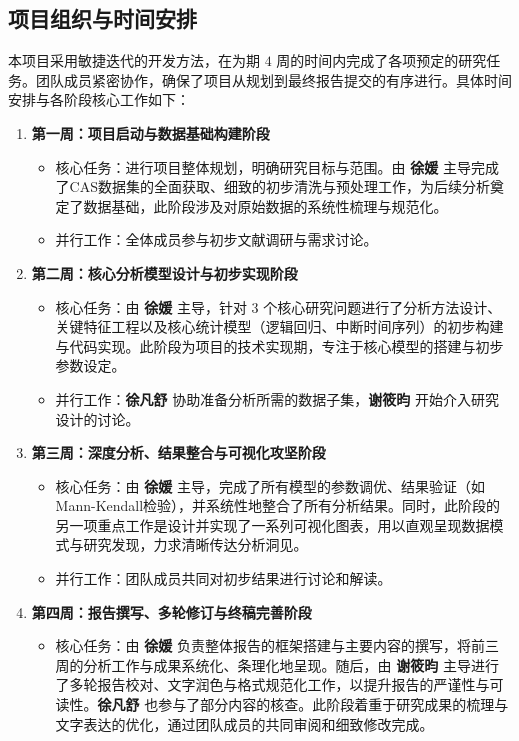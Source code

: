 \documentclass[12pt,a4paper]{article}
\begin{document}
\subsection{项目组织与时间安排}

本项目采用敏捷迭代的开发方法，在为期 $4$ 周的时间内完成了各项预定的研究任务。团队成员紧密协作，确保了项目从规划到最终报告提交的有序进行。具体时间安排与各阶段核心工作如下：

\begin{enumerate}
\item \textbf{第一周：项目启动与数据基础构建阶段}
    \begin{itemize}
    \item 核心任务：进行项目整体规划，明确研究目标与范围。由 \textbf{徐媛} 主导完成了CAS数据集的全面获取、细致的初步清洗与预处理工作，为后续分析奠定了数据基础，此阶段涉及对原始数据的系统性梳理与规范化。
    \item 并行工作：全体成员参与初步文献调研与需求讨论。
    \end{itemize}

\item \textbf{第二周：核心分析模型设计与初步实现阶段}
    \begin{itemize}
    \item 核心任务：由 \textbf{徐媛} 主导，针对 $3$ 个核心研究问题进行了分析方法设计、关键特征工程以及核心统计模型（逻辑回归、中断时间序列）的初步构建与代码实现。此阶段为项目的技术实现期，专注于核心模型的搭建与初步参数设定。
    \item 并行工作：\textbf{徐凡舒} 协助准备分析所需的数据子集，\textbf{谢筱昀} 开始介入研究设计的讨论。
    \end{itemize}

\item \textbf{第三周：深度分析、结果整合与可视化攻坚阶段}
    \begin{itemize}
    \item 核心任务：由 \textbf{徐媛} 主导，完成了所有模型的参数调优、结果验证（如Mann-Kendall检验），并系统性地整合了所有分析结果。同时，此阶段的另一项重点工作是设计并实现了一系列可视化图表，用以直观呈现数据模式与研究发现，力求清晰传达分析洞见。
    \item 并行工作：团队成员共同对初步结果进行讨论和解读。
    \end{itemize}

\item \textbf{第四周：报告撰写、多轮修订与终稿完善阶段}
    \begin{itemize}
    \item 核心任务：由 \textbf{徐媛} 负责整体报告的框架搭建与主要内容的撰写，将前三周的分析工作与成果系统化、条理化地呈现。随后，由 \textbf{谢筱昀} 主导进行了多轮报告校对、文字润色与格式规范化工作，以提升报告的严谨性与可读性。\textbf{徐凡舒} 也参与了部分内容的核查。此阶段着重于研究成果的梳理与文字表达的优化，通过团队成员的共同审阅和细致修改完成。
    \end{itemize}
\end{enumerate}
\end{document}

